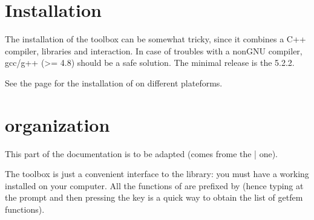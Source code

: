 \documentclass[a4paper,11pt,english]{sphinxmanual}
\begin{document}
\chapter{Installation}
\label{\detokenize{scilab/install:installation}}\label{\detokenize{scilab/install:sci-install}}\label{\detokenize{scilab/install::doc}}
\sphinxAtStartPar
The installation of the   toolbox can be somewhat tricky, since it combines a C++ compiler, libraries and  interaction. In case of troubles with a
non\sphinxhyphen{}GNU compiler, gcc/g++ (\textgreater{}= 4.8) should be a safe solution. The minimal  release is the 5.2.2.

\sphinxAtStartPar
See the  page for the installation of  on different plateforms.


\chapter{ organization}
\label{\detokenize{scilab/scilabgf:gfm-organization}}\label{\detokenize{scilab/scilabgf:scilab-gf}}\label{\detokenize{scilab/scilabgf::doc}}
\sphinxAtStartPar
This part of the   documentation is to be adapted (comes frome the |
  one).

\sphinxAtStartPar
The  toolbox is just a convenient interface to the  library: you must
have a working  installed on your computer. All the functions of 
are prefixed by  (hence typing  at the  prompt and then
pressing the  key is a quick way to obtain the list of getfem
functions).
\end{document}

